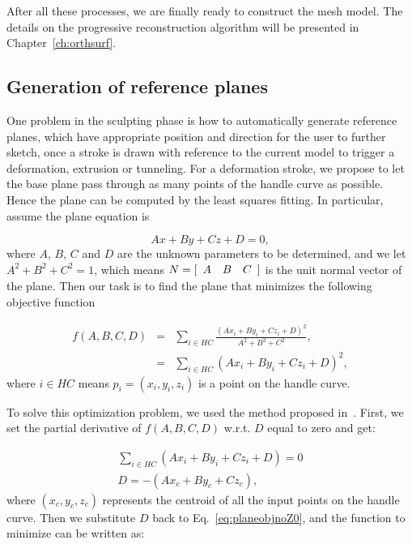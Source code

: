 After all these processes, we are finally ready to construct  the
mesh model. The details on the progressive reconstruction algorithm
will be presented in Chapter~\ref{ch:orthsurf}.


\subsection{Generation of reference planes}
\label{ch3:sec:algo:refplane}

One problem in the sculpting phase is how to automatically generate
reference planes, which have appropriate position and direction for
the user to further sketch, once a stroke is drawn with reference to
the current model to trigger a deformation, extrusion or tunneling.
For a deformation stroke, we propose to let the base plane pass
through as many points of the handle curve as possible. Hence the
plane can be computed by the least squares fitting. In particular,
assume the plane equation is

\begin{equation}
\label{eq:planefunc}
    Ax+By+Cz+D=0,
\end{equation}
where $A$, $B$, $C$ and $D$ are the unknown parameters to be determined,
and we let $A^2+B^2+C^2=1$, which means
$N = [\begin{array}{*{20}c} A & B & C \end{array}]$ is the unit normal
vector of the plane. Then our task is to find the plane that minimizes
the following objective function

\begin{eqnarray}
\label{eq:planeobjnoZ0}
    f(A,B,C,D) &=& \sum\limits_{i \in HC}
    {\frac {(Ax_i+By_i+Cz_i+D)^2}{A^2+B^2+C^2}},\nonumber\\
    &=& \sum\limits_{i \in HC} {(Ax_i+By_i+Cz_i+D)^2},
\end{eqnarray}
where $i \in HC$  means $p_i=(x_i,y_i,z_i)$ is a point on the handle curve.

To solve this optimization problem, we used the method proposed
in~\cite{SWMB59}. First, we set the partial derivative of
$f(A,B,C,D)$ w.r.t. $D$ equal to zero and get:

\begin{eqnarray}
\label{eq:planeobjPartD}
    \sum\limits_{i \in HC} {(Ax_i+By_i+Cz_i+D)} = 0\nonumber\\
    D = -(Ax_c + By_c + Cz_c),
\end{eqnarray}
where $(x_c, y_c, z_c)$ represents the centroid of all the
input points on the handle curve. Then we substitute $D$ back
to Eq.~\ref{eq:planeobjnoZ0}, and the function to minimize can
be written as:

